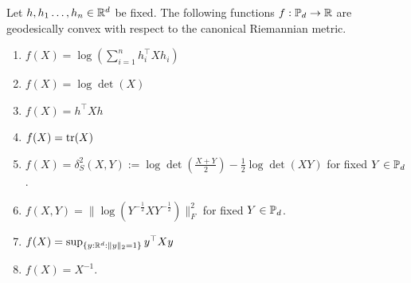 \documentclass[twoside,11pt]{article}
\begin{document}
\begin{prop}
Let $h, h_1 \ldots, h_n \in \mathbb{R}^d$ be fixed. The following functions $f:\mathbb{P}_d \to \mathbb{R}$ are geodesically convex with respect to the canonical Riemannian metric. 
    \begin{enumerate}[label=(\theenumi)]
        \item $f(X) = \log \left(\sum_{i=1}^n h_i^\top X h_i\right)$
        \item $f(X) = \log \det(X)$
        \item $f(X) = h^\top X h$
        \item $f(X) = \text{tr} (X)$
        \item $f(X) = \delta_S^2(X,Y):= \log \det \left(\frac{X+Y}{2}\right) - \frac{1}{2}\log\det(XY)$ for fixed $Y \in \mathbb{P}_d$.
        \item $f(X,Y) = \|\log \left(Y^{-\frac{1}{2}}X Y^{-\frac{1}{2}} \right) \|_F^2$ for fixed $Y \in \mathbb{P}_d$.
        \item $f(X) = \sup_{\{y:\mathbb{R}^d : \|y\|_2=1\}}y^\top X y$
        \item $f(X) = X^{-1}$.
    \end{enumerate}
\end{prop}
\end{document}
